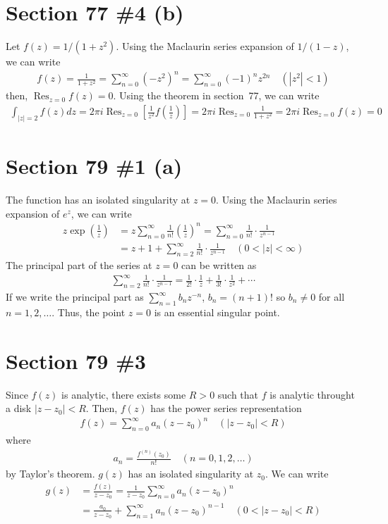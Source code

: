 \documentclass{scrartcl}
\DeclareMathOperator*{\Res}{Res}
\begin{document}
\section{Section 77 \#4 (b)}
Let \(f(z) = 1 / (1 + z^2)\).
Using the Maclaurin series expansion of \(1 / (1 - z)\), we can write
\begin{align*}
  f(z)
  = \frac{1}{1 + z^2}
  = \sum^\infty_{n = 0} (-z^2)^n
  = \sum^\infty_{n = 0} (-1)^n z^{2n} \quad (|z^2| < 1)
\end{align*}
then, \(\Res_{z = 0} f(z) = 0\).
Using the theorem in section~77, we can write
\begin{align*}
  \int_{|z| = 2} f(z) dz
  = 2\pi i \Res_{z = 0} \left[ \frac{1}{z^2} f \left( \frac{1}{z} \right) \right]
  = 2\pi i \Res_{z = 0} \frac{1}{1 + z^2}
  = 2\pi i \Res_{z = 0} f(z)
  = 0
\end{align*}

\section{Section 79 \#1 (a)}
The function has an isolated singularity at \(z = 0\).
Using the Maclaurin series expansion of \(e^z\), we can write
\begin{align*}
  z \exp \left( \frac{1}{z} \right)
  &= z \sum^\infty_{n = 0} \frac{1}{n!} \left( \frac{1}{z} \right)^n
  = \sum^\infty_{n = 0} \frac{1}{n!} \cdot \frac{1}{z^{n - 1}} \\
  &= z + 1 + \sum^\infty_{n = 2} \frac{1}{n!} \cdot \frac{1}{z^{n - 1}} \quad (0 < |z| < \infty)
\end{align*}
The principal part of the series at \(z = 0\) can be written as
\begin{align*}
  \sum^\infty_{n = 2} \frac{1}{n!} \cdot \frac{1}{z^{n - 1}}
  = \frac{1}{2!} \cdot \frac{1}{z} + \frac{1}{3!} \cdot \frac{1}{z^2} + \cdots
\end{align*}
If we write the principal part as \(\sum^\infty_{n = 1} b_n z^{-n}\), \(b_n = (n + 1)!\) so \(b_n \not = 0\) for all \(n = 1, 2, \dots\).
Thus, the point \(z = 0\) is an essential singular point.

\section{Section 79 \#3}
Since \(f(z)\) is analytic, there exists some \(R > 0\) such that \(f\) is analytic throught a disk \(|z - z_0| < R\).
Then, \(f(z)\) has the power series representation
\begin{align*}
  f(z) = \sum^\infty_{n = 0} a_n(z - z_0)^n \quad (|z - z_0| < R)
\end{align*}
where
\begin{align*}
  a_n = \frac{f^{(n)}(z_0)}{n!} \quad (n = 0, 1, 2, \dots)
\end{align*}
by Taylor's theorem.
\(g(z)\) has an isolated singularity at \(z_0\).
We can write
\begin{align*}
  g(z)
  &= \frac{f(z)}{z - z_0}
  = \frac{1}{z - z_0} \sum^\infty_{n = 0} a_n(z - z_0)^n \\
  &= \frac{a_0}{z - z_0} + \sum^\infty_{n = 1} a_n (z - z_0)^{n - 1} \quad (0 < |z - z_0| < R)
\end{align*}
\end{document}
